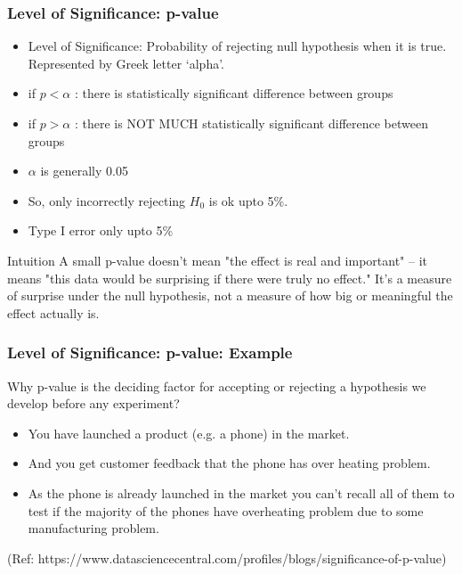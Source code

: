 \begin{frame}[fragile]\frametitle{Level of Significance: p-value}
\begin{itemize}
\item Level of Significance: Probability of rejecting null  
hypothesis when it is true. Represented by Greek letter `alpha'. 
\item if $p < \alpha$ : there is statistically significant difference between groups
\item if $p > \alpha$ : there is NOT MUCH statistically significant difference between groups
\item $\alpha$ is generally 0.05
\item So, only incorrectly rejecting $H_0$ is ok upto 5\%.
\item Type I error only upto 5\%
\end{itemize}

\begin{block}{Intuition}
A small p-value doesn't mean "the effect is real and important" -- it means "this data would be surprising if there were truly no effect." It's a measure of surprise under the null hypothesis, not a measure of how big or meaningful the effect actually is.
\end{block}
\end{frame}

\begin{frame}[fragile]\frametitle{Level of Significance: p-value: Example}
 Why p-value is the deciding factor for accepting or rejecting a hypothesis we
develop before any experiment?
\begin{itemize}
\item You have launched a product (e.g. a phone) in the market. 
\item And you get customer feedback that the phone has over heating problem. 
\item As the phone is already launched in the market you can't recall all of them to test if the majority of the phones have overheating problem due to some manufacturing problem.
\end{itemize}

(Ref: https://www.datasciencecentral.com/profiles/blogs/significance-of-p-value)
\end{frame}


